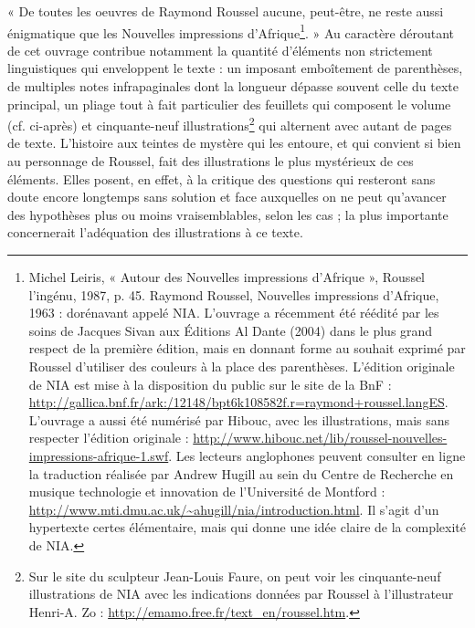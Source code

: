 \documentclass[nofonts]{tufte-handout}
\begin{document}
« De toutes les oeuvres de Raymond Roussel aucune, peut-être, ne reste aussi énigmatique que les Nouvelles impressions d’Afrique\footnote{Michel Leiris, « Autour des Nouvelles impressions d’Afrique », Roussel l’ingénu, 1987, p. 45. Raymond Roussel, Nouvelles impressions d’Afrique, 1963 : dorénavant appelé NIA. L’ouvrage a récemment été réédité par les soins de Jacques Sivan aux Éditions Al Dante (2004) dans le plus grand respect de la première édition, mais en donnant forme au souhait exprimé par Roussel d’utiliser des couleurs à la place des parenthèses. L’édition originale de NIA est mise à la disposition du public sur le site de la BnF : \url{http://gallica.bnf.fr/ark:/12148/bpt6k108582f.r=raymond+roussel.langES}. L’ouvrage a aussi été numérisé par Hibouc, avec les illustrations, mais sans respecter l’édition originale : \url{http://www.hibouc.net/lib/roussel-nouvelles-impressions-afrique-1.swf}. Les lecteurs anglophones peuvent consulter en ligne la traduction réalisée par Andrew Hugill au sein du Centre de Recherche en musique technologie et innovation de l’Université de Montford : \url{http://www.mti.dmu.ac.uk/~ahugill/nia/introduction.html}. Il s’agit d’un hypertexte certes élémentaire, mais qui donne une idée claire de la complexité de NIA.}. » Au caractère déroutant de cet ouvrage contribue notamment la quantité d’éléments non strictement linguistiques qui enveloppent le texte : un imposant emboîtement de parenthèses, de multiples notes infrapaginales dont la longueur dépasse souvent celle du texte principal, un pliage tout à fait particulier des feuillets qui composent le volume (cf. ci-après) et cinquante-neuf illustrations\footnote{Sur le site du sculpteur Jean-Louis Faure, on peut voir les cinquante-neuf illustrations de NIA avec les indications données par Roussel à l’illustrateur Henri-A. Zo : \url{http://emamo.free.fr/text_en/roussel.htm}.} qui alternent avec autant de pages de texte. L’histoire aux teintes de mystère qui les entoure, et qui convient si bien au personnage de Roussel, fait des illustrations le plus mystérieux de ces éléments. Elles posent, en effet, à la critique des questions qui resteront sans doute encore longtemps sans solution et face auxquelles on ne peut qu’avancer des hypothèses plus ou moins vraisemblables, selon les cas ; la plus importante concernerait l’adéquation des illustrations à ce texte.
\end{document}
